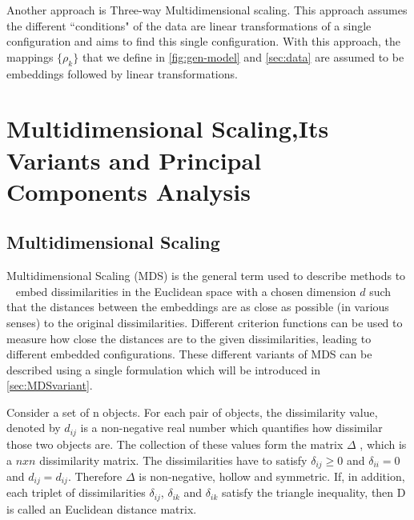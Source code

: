\documentclass[12pt,oneside,final]{thesis}\usepackage[]{graphicx}\usepackage[]{color}
\begin{document}
Another approach is Three-way Multidimensional scaling\cite{3wayNMDS,borg+groenen:1997}.
 This approach assumes the  different ``conditions" of the data are linear transformations of a single configuration and aims to find this single configuration. With this approach, the mappings  $\{\rho_k \}$ that we define in \autoref{fig:gen-model} and \autoref{sec:data} are  assumed to be embeddings followed by linear transformations.




\chapter{Multidimensional Scaling,Its Variants and Principal Components Analysis}
\label{sec:MDS}



\section{Multidimensional Scaling}
Multidimensional Scaling (MDS) is the general term used to describe methods to  ~\cite{CMDS,borg+groenen:1997,duin2005dissimilarity}  embed dissimilarities in the Euclidean space  with a chosen dimension $d$ such that the distances between the embeddings are as close as possible (in various senses) to the original dissimilarities. Different criterion functions can be used to measure how close the distances are  to the given dissimilarities, leading to different embedded configurations. These different variants of MDS can be described using a single formulation which will be introduced in \autoref{sec:MDSvariant}.

Consider a  set of n objects. For each pair of objects, the dissimilarity value, denoted by $d_{ij}$ is a non-negative real number which quantifies how dissimilar those two objects are. The collection of these values form the matrix $\Delta$ , which is  a $nxn$ dissimilarity matrix. %
The dissimilarities have to satisfy $\delta_{ij}\geq 0$ and $\delta_{ii}=0$ and $d_{ij}=d_{ij}$. Therefore  $\Delta$ is non-negative, hollow and symmetric. If, in addition, each triplet of dissimilarities $\delta_{ij}$, $\delta_{ik}$ and $\delta_{ik}$  satisfy the triangle inequality, then D is called  an Euclidean distance matrix.
\end{document}
